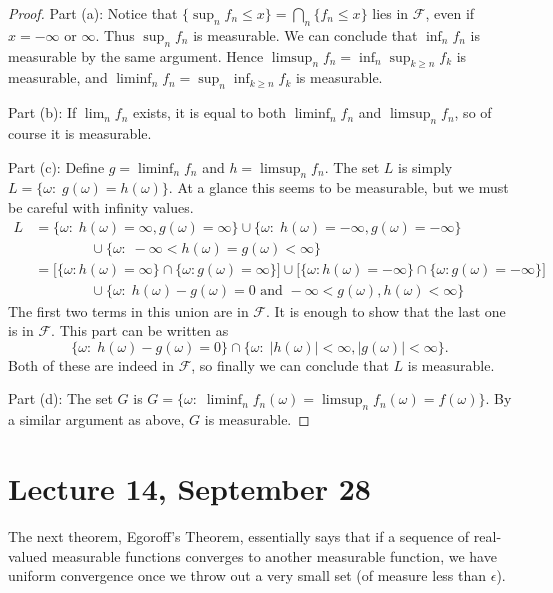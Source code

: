 \documentclass[11pt,fleqn]{book} %
\begin{document}
\begin{proof}
	Part (a): Notice that $\{\sup_n f_n \leq x\} = \bigcap_n \{f_n \leq x\}$ lies in $\mathcal{F}$, even if $x = -\infty$ or $\infty$. Thus $\sup_n f_n$ is measurable. We can conclude that $\inf_n f_n$ is measurable by the same argument. Hence $\limsup_n f_n = \inf_n \sup_{k \geq n} f_k$ is measurable, and $\liminf_n f_n = \sup_n \inf_{k \geq n} f_k$ is measurable.

	Part (b): If $\lim_n f_n$ exists, it is equal to both $\liminf_n f_n$ and $\limsup_n f_n$, so of course it is measurable.

	Part (c): Define $g = \liminf_n f_n$ and $h = \limsup_n f_n$. The set $L$ is simply $L = \{\omega:\;g(\omega) = h(\omega)\}$. At a glance this seems to be measurable, but we must be careful with infinity values.
	\begin{align*}
		L &= \{\omega:\;h(\omega)=\infty, g(\omega)=\infty\} \cup \{\omega:\;h(\omega)=-\infty, g(\omega)=-\infty\} \\
		& \qquad \qquad \cup \{\omega:\;-\infty < h(\omega) = g(\omega) < \infty\} \\
		&= \Big[ \{\omega:h(\omega)=\infty\} \cap \{\omega:g(\omega)=\infty\} \Big] \cup \Big[ \{\omega:h(\omega)=-\infty\} \cap \{\omega:g(\omega)=-\infty\} \Big] \\
		& \qquad \qquad \cup \{\omega:\;h(\omega) - g(\omega) = 0 \textrm{ and } -\infty < g(\omega),h(\omega) < \infty\}
	\end{align*}
	The first two terms in this union are in $\mathcal{F}$. It is enough to show that the last one is in $\mathcal{F}$. This part can be written as
	\[
		\{\omega:\;h(\omega)-g(\omega)=0\} \cap \{\omega:\;|h(\omega)|<\infty, |g(\omega)|<\infty\}.
	\]
	Both of these are indeed in $\mathcal{F}$, so finally we can conclude that $L$ is measurable.

	Part (d): The set $G$ is $G = \{\omega:\;\liminf_n f_n(\omega) = \limsup_n f_n(\omega) = f(\omega)\}$. By a similar argument as above, $G$ is measurable.
\end{proof}

\section{Lecture 14, September 28}

The next theorem, Egoroff's Theorem, essentially says that if a sequence of real-valued measurable functions converges to another measurable function, we have uniform convergence once we throw out a very small set (of measure less than $\epsilon$).
\end{document}
